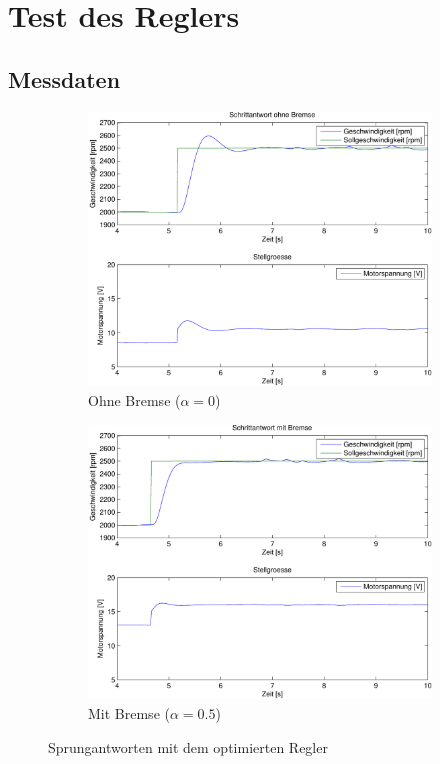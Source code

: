\section{Test des Reglers}

\subsection{Messdaten}

\begin{figure}[h!]
	\centering
	\begin{subfigure}{0.475\textwidth}
		\includegraphics[width=1\textwidth]{12/step_noload.pdf}
		\caption{Ohne Bremse ($\alpha = 0$)}
	\end{subfigure}
	\hfill{}
	\begin{subfigure}{0.475\textwidth}
		\includegraphics[width=1\textwidth]{12/step_load.pdf}
		\caption{Mit Bremse ($\alpha = 0.5$)}
	\end{subfigure}
	\caption{Sprungantworten mit dem optimierten Regler}
\end{figure}



